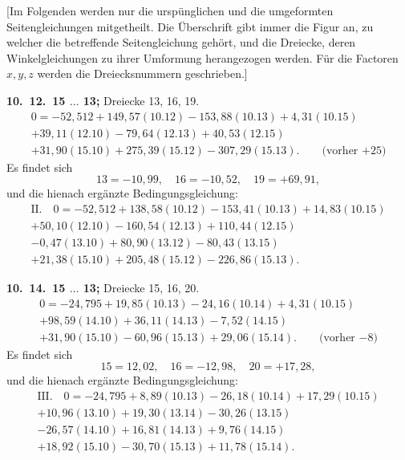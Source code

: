 \documentclass[12pt,a4paper]{article}
\theoremstyle{plain}
\theoremstyle{definition}
\theoremstyle{remark}
\begin{document}
[Im Folgenden werden nur die ursp\"unglichen und die umgeformten Seitengleichungen mitgetheilt. Die \"Uberschrift gibt immer die Figur an, zu welcher die betreffende Seitengleichung geh\"ort, und die Dreiecke, deren Winkelgleichungen zu ihrer Umformung herangezogen werden. F\"ur die Factoren $x, y, z$ werden die Dreiecksnummern geschrieben.]

\medskip\noindent
\textbf{10.\ 12.\ 15 $\ldots$ 13;} Dreiecke 13, 16, 19.
\begin{multline*}
0 = -52{,}512 + 149{,}57(10.12) - 153{,}88(10.13) + 4{,}31(10.15)\\
+ 39{,}11(12.10) - 79{,}64(12.13) + 40{,}53(12.15)\\
+ 31{,}90(15.10) + 275{,}39(15.12) - 307{,}29(15.13).\qquad\text{(vorher $+25$)}
\end{multline*}
Es findet sich
\[13 = -10{,}99, \quad 16 = -10{,}52, \quad 19 = +69{,}91,\]
und die hienach erg\"anzte Bedingungsgleichung:
\begin{multline*}
\text{II.}\quad 0 = -52{,}512 + 138{,}58(10.12) - 153{,}41(10.13) + 14{,}83(10.15)\\
+ 50{,}10(12.10) - 160{,}54(12.13) + 110{,}44(12.15)\\
- 0{,}47(13.10) + 80{,}90(13.12) - 80{,}43(13.15)\\
+ 21{,}38(15.10) + 205{,}48(15.12) - 226{,}86(15.13).
\end{multline*}

\medskip\noindent
\textbf{10.\ 14.\ 15 $\ldots$ 13;} Dreiecke 15, 16, 20.
\begin{multline*}
0 = -24{,}795 + 19{,}85(10.13) - 24{,}16(10.14) + 4{,}31(10.15)\\
+ 98{,}59(14.10) + 36{,}11(14.13) - 7{,}52(14.15)\\
+ 31{,}90(15.10) - 60{,}96(15.13) + 29{,}06(15.14).\qquad\text{(vorher $-8$)}
\end{multline*}
Es findet sich
\[15 = 12{,}02, \quad 16 = -12{,}98, \quad 20 = +17{,}28,\]
und die hienach erg\"anzte Bedingungsgleichung:
\begin{multline*}
\text{III.}\quad 0 = -24{,}795 + 8{,}89(10.13) - 26{,}18(10.14) + 17{,}29(10.15)\\
+ 10{,}96(13.10) + 19{,}30(13.14) - 30{,}26(13.15)\\
- 26{,}57(14.10) + 16{,}81(14.13) + 9{,}76(14.15)\\
+ 18{,}92(15.10) - 30{,}70(15.13) + 11{,}78(15.14).
\end{multline*}
\end{document}

